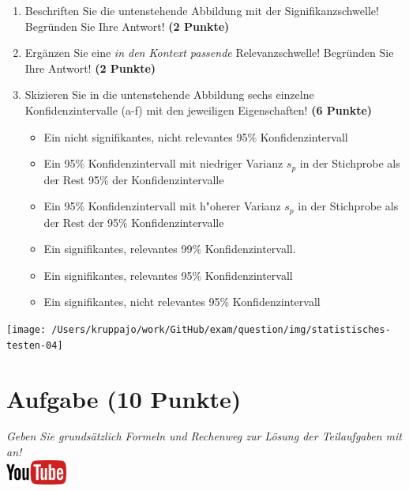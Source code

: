\documentclass[a4paper, 9pt]{scrartcl}\usepackage[]{graphicx}\usepackage[]{xcolor}
\begin{document}
\begin{enumerate}
\item Beschriften Sie die untenstehende Abbildung mit der
  Signifikanzschwelle! Begr{\"u}nden Sie Ihre Antwort! \textbf{(2 Punkte)}
\item Erg{\"a}nzen Sie eine \textit{in den Kontext passende} Relevanzschwelle!
  Begr{\"u}nden Sie Ihre Antwort! \textbf{(2 Punkte)} 
\item Skizieren Sie in die
  untenstehende Abbildung sechs einzelne Konfidenzintervalle (a-f) mit den
  jeweiligen Eigenschaften! \textbf{(6 Punkte)}
  \begin{itemize}
  \item[(a)] Ein nicht signifikantes, nicht relevantes 95\% Konfidenzintervall 	
  \item[(b)] Ein 95\% Konfidenzintervall mit niedriger Varianz $s_p$ in der Stichprobe als der Rest 95\% der Konfidenzintervalle 	
  \item[(c)] Ein 95\% Konfidenzintervall mit h{"o}herer Varianz $s_p$ in der Stichprobe als der Rest der 95\% Konfidenzintervalle 	
  \item[(d)] Ein signifikantes, relevantes 99\% Konfidenzintervall. 
  \item[(e)] Ein signifikantes, relevantes 95\% Konfidenzintervall
  \item[(f)] Ein signifikantes, nicht relevantes 95\% Konfidenzintervall
  \end{itemize}
\end{enumerate}

\begin{center}
  \texttt{[image: /Users/kruppajo/work/GitHub/exam/question/img/statistisches-testen-04]}
\end{center}


 
\clearpage

\section{Aufgabe \hfill (10 Punkte)}

\textit{Geben Sie grunds{\"a}tzlich Formeln und Rechenweg zur L{\"o}sung der
  Teilaufgaben mit an!} \\[1Ex]

\hfill\href{https://youtu.be/FgZmpnEWDag}{\includegraphics[width =
  2cm]{img/youtube}}\\[1Ex]
\end{document}
